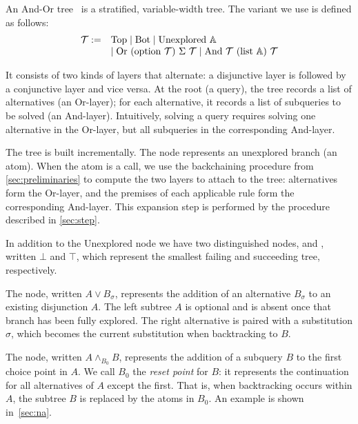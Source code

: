 \documentclass[sigplan,10pt,anonymous,review]{acmart}
\begin{document}
An And-Or tree~\cite{Kowalski1979} is a stratified, variable-width tree.
The variant we use is defined as follows:
%
$$
\begin{array}{ll}
\TREE := & \mathrm{Top} \mid \mathrm{Bot} \mid \mathrm{Unexplored}\ \ATOM \\
&  \mid \mathrm{Or}\ (\mathrm{option}\ \TREE)\ \Sigma\ \TREE \mid \mathrm{And}\ \TREE\ (\mathrm{list}\ \ATOM)\ \TREE
\end{array}
$$

It consists of two kinds
of layers that alternate: a disjunctive layer is followed by a conjunctive
layer and vice versa. At the root (a query), the tree records a list of
alternatives (an Or-layer); for each alternative, it records a list of
subqueries to be solved (an And-layer). Intuitively, solving a query requires
solving one alternative in the Or-layer, but all subqueries in the
corresponding And-layer. 


The tree is built incrementally. The \taC{} node
represents an unexplored branch (an atom). When the atom is a
call, we use the backchaining procedure from
\cref{sec:preliminaries} to compute the two layers to attach to the tree:
alternatives form the Or-layer, and the premises of each applicable rule form
the corresponding And-layer. This expansion step is performed by the
\step{} procedure described in \cref{sec:step}.

In
addition to the Unexplored node we have two distinguished nodes, \koC and
\okC, written $\bot$ and $\top$, which represent the smallest failing and
succeeding tree, respectively.

The \orC node, written \(A \lor B_\sigma\), represents the addition of an
alternative \(B_\sigma\) to an existing disjunction $A$. The left subtree
\(A\) is optional and is absent once that branch has been fully explored.
The right alternative is paired with a substitution \(\sigma\), which becomes
the current substitution when backtracking to \(B\). %

The \andC{} node, written \(A \land_{B_0} B\), represents the addition
of a subquery \(B\) to the first choice point in \(A\). We call
\(B_0\) the \emph{reset point} for \(B\): it represents the
continuation for all alternatives of \(A\) except the first. That is,
when backtracking occurs within \(A\), the subtree \(B\) is replaced by
the atoms in \(B_0\). An example is shown in~\cref{sec:na}.
\end{document}
